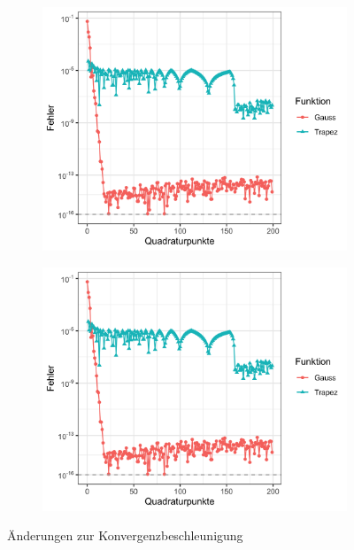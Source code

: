 \documentclass[12pt,a4paper]{scrartcl}
\numberwithin{equation}{section}
\numberwithin{myalgctr}{section}
\numberwithin{mytheoremctr}{subsection}
\numberwithin{mykorollarctr}{subsection}
\numberwithin{mylemmactr}{subsection}
\numberwithin{mybeispielctr}{subsection}
\begin{document}
	
	\begin{figure}[H]
		\begin{subfigure}[c]{0.5\textwidth}
			
			\includegraphics[width=\linewidth]{../plots/aufgabe-e2.png}
			\label{fig:gewichtsfunktionen-vergleich}
			
		\end{subfigure}
		\begin{subfigure}[c]{0.5\textwidth}
			\includegraphics[width=\linewidth]{../plots/aufgabe-e2.png}
			\label{fig:gauss-vs-besseretrapez}
		\end{subfigure}
	\caption{\"Anderungen zur Konvergenzbeschleunigung}
	\end{figure}
	
\end{document}
